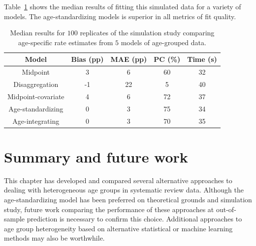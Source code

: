 Table~\ref{age_group_comparison} shows the median results of fitting this simulated data for a variety of models. The age-standardizing models is
superior in all metrics of fit quality.

\begin{table}

\caption{Median results for $100$ replicates of the simulation study
  comparing age-specific rate estimates from $5$ models of age-grouped
  data.}
\label{age_group_comparison}

\begin{center}
\begin{tabular}{|c|c|c|c|c|}
\hline
Model              &Bias (pp)&MAE (pp)&PC (\%)&Time (s)\\
\hline
Midpoint             &     3 &    6 &  60 &  32 \\
Disaggregation       &    -1 &   22 &   5 &  40 \\
Midpoint-covariate   &     4 &    6 &  72 &  37 \\
Age-standardizing    &     0 &    3 &  75 &  34 \\
Age-integrating      &     0 &    3 &  70 &  35 \\
\hline
\end{tabular}
\end{center}
\end{table}

\section{Summary and future work}
This chapter has developed and compared several alternative approaches
to dealing with heterogeneous age groups in systematic review data.
Although the age-standardizing model has been preferred on theoretical
grounds and simulation study, future work comparing the performance of
these approaches at out-of-sample prediction is necessary to confirm
this choice.  Additional approaches to age group heterogeneity based
on alternative statistical or machine learning methods may also be
worthwhile.
